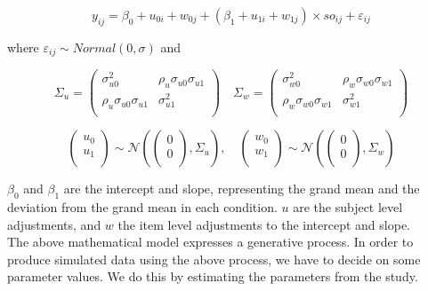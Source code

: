 \documentclass[12pt,]{krantz}
\begin{document}
\begin{equation}
y_{ij} = \beta_0 + u_{0i} + w_{0j} + (\beta_1 + u_{1i} + w_{1j}) \times so_{ij} + \varepsilon_{ij}
\end{equation}

where \(\varepsilon_{ij} \sim Normal(0,\sigma)\) and

\begin{equation}\label{eq:covmatsimulations}
\Sigma_u
=
\begin{pmatrix}
\sigma _{u0}^2  & \rho _{u}\sigma _{u0}\sigma _{u1}\\
\rho _{u}\sigma _{u0}\sigma _{u1}    & \sigma _{u1}^2\\
\end{pmatrix}
\quad 
\Sigma _w
=
\begin{pmatrix}
\sigma _{w0}^2  & \rho _{w}\sigma _{w0}\sigma _{w1}\\
\rho _{w}\sigma _{w0}\sigma _{w1}    & \sigma _{w1}^2\\
\end{pmatrix}
\end{equation}

\begin{equation}\label{eq:jointpriordistsimulation}
\begin{pmatrix}
  u_0 \\ 
  u_1 \\
\end{pmatrix}
\sim 
\mathcal{N} \left(
\begin{pmatrix}
  0 \\
  0 \\
\end{pmatrix},
\Sigma_{u}
\right),
\quad
\begin{pmatrix}
  w_0 \\ 
  w_1 \\
\end{pmatrix}
\sim 
\mathcal{N}\left(
\begin{pmatrix}
  0 \\
  0 \\
\end{pmatrix},
\Sigma_{w}
\right)
\end{equation}

\(\beta_0\) and \(\beta_1\) are the intercept and slope, representing the grand mean and the deviation from the grand mean in each condition. \(u\) are the subject level adjustments, and \(w\) the item level adjustments to the intercept and slope.\\
The above mathematical model expresses a generative process. In order to produce simulated data using the above process, we have to decide on some parameter values. We do this by estimating the parameters from the \citet{grodner} study.
\end{document}
